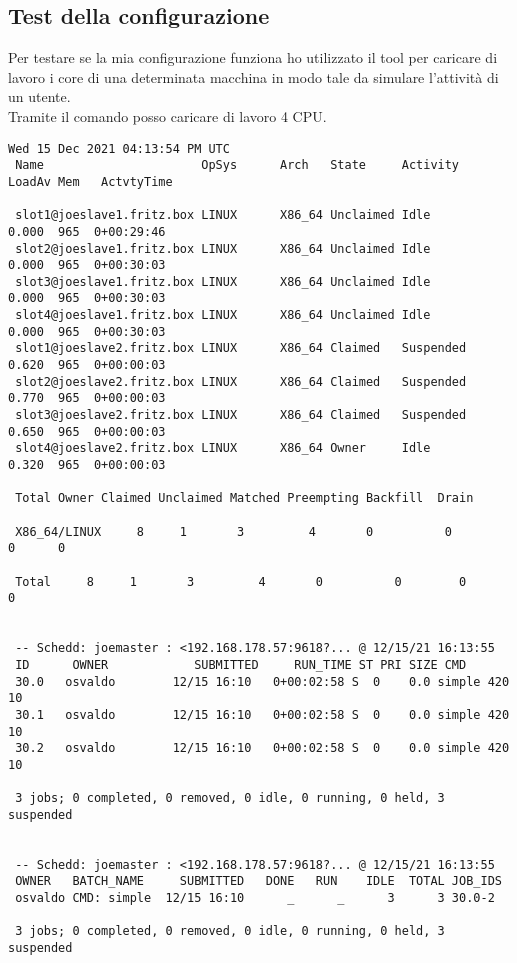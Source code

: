 \subsection{Test della configurazione}

Per testare se la mia configurazione funziona ho utilizzato il tool  per caricare di lavoro i core di una determinata macchina in modo tale da simulare l'attivit\`{a} di un utente.\\
Tramite il comando  posso caricare di lavoro 4 CPU. %

\begin{lstlisting}[style=output_tiny]
 Wed 15 Dec 2021 04:13:54 PM UTC
 Name                      OpSys      Arch   State     Activity  LoadAv Mem   ActvtyTime
 
 slot1@joeslave1.fritz.box LINUX      X86_64 Unclaimed Idle       0.000  965  0+00:29:46
 slot2@joeslave1.fritz.box LINUX      X86_64 Unclaimed Idle       0.000  965  0+00:30:03
 slot3@joeslave1.fritz.box LINUX      X86_64 Unclaimed Idle       0.000  965  0+00:30:03
 slot4@joeslave1.fritz.box LINUX      X86_64 Unclaimed Idle       0.000  965  0+00:30:03
 slot1@joeslave2.fritz.box LINUX      X86_64 Claimed   Suspended  0.620  965  0+00:00:03
 slot2@joeslave2.fritz.box LINUX      X86_64 Claimed   Suspended  0.770  965  0+00:00:03
 slot3@joeslave2.fritz.box LINUX      X86_64 Claimed   Suspended  0.650  965  0+00:00:03
 slot4@joeslave2.fritz.box LINUX      X86_64 Owner     Idle       0.320  965  0+00:00:03
 
 Total Owner Claimed Unclaimed Matched Preempting Backfill  Drain
 
 X86_64/LINUX     8     1       3         4       0          0        0      0
 
 Total     8     1       3         4       0          0        0      0
 
 
 -- Schedd: joemaster : <192.168.178.57:9618?... @ 12/15/21 16:13:55
 ID      OWNER            SUBMITTED     RUN_TIME ST PRI SIZE CMD
 30.0   osvaldo        12/15 16:10   0+00:02:58 S  0    0.0 simple 420 10
 30.1   osvaldo        12/15 16:10   0+00:02:58 S  0    0.0 simple 420 10
 30.2   osvaldo        12/15 16:10   0+00:02:58 S  0    0.0 simple 420 10
 
 3 jobs; 0 completed, 0 removed, 0 idle, 0 running, 0 held, 3 suspended
 
 
 -- Schedd: joemaster : <192.168.178.57:9618?... @ 12/15/21 16:13:55
 OWNER   BATCH_NAME     SUBMITTED   DONE   RUN    IDLE  TOTAL JOB_IDS
 osvaldo CMD: simple  12/15 16:10      _      _      3      3 30.0-2
 
 3 jobs; 0 completed, 0 removed, 0 idle, 0 running, 0 held, 3 suspended
 
\end{lstlisting}

